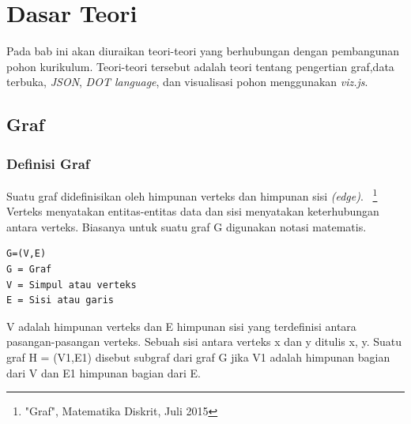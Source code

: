 
\chapter{Dasar Teori}
\label{chap:Dasar Teori}
Pada bab ini akan diuraikan teori-teori yang berhubungan dengan pembangunan pohon kurikulum. Teori-teori tersebut adalah teori tentang pengertian graf,data terbuka, \textit{JSON}, \textit{DOT language}, dan visualisasi pohon menggunakan \textit{viz.js}.

\section{Graf}
\label{sec: Graf}

\subsection{Definisi Graf}
\label{sec: Definisi Graf}
Suatu graf didefinisikan oleh himpunan verteks dan himpunan sisi \textit{(edge)}.~\cite{munir:02:graf}
\footnote{"Graf", Matematika Diskrit, Juli 2015}
Verteks menyatakan entitas-entitas data dan sisi menyatakan keterhubungan antara
verteks. Biasanya untuk suatu graf G digunakan notasi matematis. 
\begin{lstlisting}
G=(V,E)
G = Graf
V = Simpul atau verteks
E = Sisi atau garis
\end{lstlisting}

V adalah himpunan verteks dan E himpunan sisi yang terdefinisi antara pasangan-pasangan verteks. Sebuah sisi antara verteks x dan y ditulis {x, y}. Suatu graf H = (V1,E1) disebut subgraf dari graf G jika V1 adalah himpunan bagian dari V dan E1 himpunan bagian dari E.

